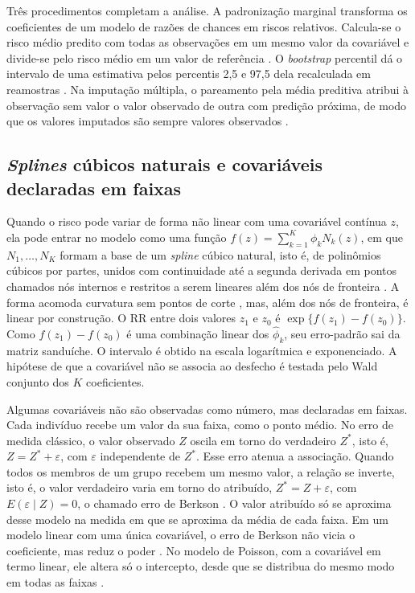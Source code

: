 \documentclass[12pt,a4paper]{article}
\begin{document}
Três procedimentos completam a análise. A padronização marginal transforma os coeficientes de um modelo de razões de chances em riscos relativos. Calcula-se o risco médio predito com todas as observações em um mesmo valor da covariável e divide-se pelo risco médio em um valor de referência \citep{muller2014estimating}. O \textit{bootstrap} percentil dá o intervalo de uma estimativa pelos percentis 2,5 e 97,5 dela recalculada em reamostras \citep{efron1993introduction}. Na imputação múltipla, o pareamento pela média preditiva atribui à observação sem valor o valor observado de outra com predição próxima, de modo que os valores imputados são sempre valores observados \citep{vanbuuren2011mice}.

\subsection{\textit{Splines} cúbicos naturais e covariáveis declaradas em faixas}
\label{sec:fund-spline}

Quando o risco pode variar de forma não linear com uma covariável contínua $z$, ela pode entrar no modelo como uma função $f(z) = \sum_{k=1}^{K} \phi_k N_k(z)$, em que $N_1, \dots, N_K$ formam a base de um \textit{spline} cúbico natural, isto é, de polinômios cúbicos por partes, unidos com continuidade até a segunda derivada em pontos chamados nós internos e restritos a serem lineares além dos nós de fronteira \citep[pp.~143--146]{hastie2009elements}. A forma acomoda curvatura sem pontos de corte \citep[p.~129]{royston2006dichotomizing}, mas, além dos nós de fronteira, é linear por construção. O RR entre dois valores $z_1$ e $z_0$ é $\exp\{f(z_1) - f(z_0)\}$. Como $f(z_1) - f(z_0)$ é uma combinação linear dos $\hat\phi_k$, seu erro-padrão sai da matriz sanduíche. O intervalo é obtido na escala logarítmica e exponenciado. A hipótese de que a covariável não se associa ao desfecho é testada pelo Wald conjunto dos $K$ coeficientes.

Algumas covariáveis não são observadas como número, mas declaradas em faixas. Cada indivíduo recebe um valor da sua faixa, como o ponto médio. No erro de medida clássico, o valor observado $Z$ oscila em torno do verdadeiro $Z^{*}$, isto é, $Z = Z^{*} + \varepsilon$, com $\varepsilon$ independente de $Z^{*}$. Esse erro atenua a associação. Quando todos os membros de um grupo recebem um mesmo valor, a relação se inverte, isto é, o valor verdadeiro varia em torno do atribuído, $Z^{*} = Z + \varepsilon$, com $E(\varepsilon \mid Z) = 0$, o chamado erro de Berkson \citep[pp.~5, 243]{carroll2006measurement}. O valor atribuído só se aproxima desse modelo na medida em que se aproxima da média de cada faixa. Em um modelo linear com uma única covariável, o erro de Berkson não vicia o coeficiente, mas reduz o poder \citep{keogh2020stratos}. No modelo de Poisson, com a covariável em termo linear, ele altera só o intercepto, desde que se distribua do mesmo modo em todas as faixas \citep[pp.~93--95]{carroll2006measurement}.
\end{document}
